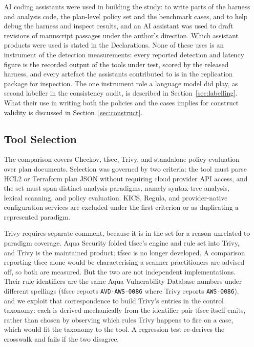 \documentclass[smallextended]{svjour3}
\begin{document}
AI coding assistants were used in building the study: to write parts of the
harness and analysis code, the plan-level policy set and the benchmark cases, and
to help debug the harness and inspect results, and an AI assistant was used to
draft revisions of manuscript passages under the author's direction. Which
assistant products were used is stated in the Declarations. None of these
uses is an instrument of the detection measurements: every reported detection and
latency figure is the recorded output of the tools under test, scored by the
released harness, and every artefact the assistants contributed to is in the
replication package for inspection. The one instrument role a language model did
play, as second labeller in the consistency audit, is described in
Section~\ref{sec:labelling}. What their use in writing both the
policies and the cases implies for construct validity is discussed in
Section~\ref{sec:construct}.

\subsection{Tool Selection}
\label{sec:toolsel}
The comparison covers Checkov, tfsec, Trivy, and standalone policy evaluation
over plan documents. Selection was governed by two criteria: the tool must parse
HCL2 or Terraform plan JSON without requiring cloud provider API access, and the
set must span distinct analysis paradigms, namely syntax-tree analysis, lexical
scanning, and policy evaluation. KICS, Regula, and provider-native configuration
services are excluded under the first criterion or as duplicating a represented
paradigm.

Trivy requires separate comment, because it is in the set for a reason unrelated
to paradigm coverage. Aqua Security folded tfsec's engine and rule set into
Trivy, and Trivy is the maintained product; tfsec is no longer developed. A
comparison reporting tfsec alone would be characterising a scanner practitioners
are advised off, so both are measured. But the two are not independent
implementations. Their rule identifiers are the same Aqua Vulnerability Database
numbers under different spellings (tfsec reports \texttt{AVD-AWS-0086} where
Trivy reports \texttt{AWS-0086}), and we exploit that correspondence to build
Trivy's entries in the control taxonomy: each is derived mechanically from the
identifier pair tfsec itself emits, rather than chosen by observing which rules
Trivy happens to fire on a case, which would fit the taxonomy to the tool. A
regression test re-derives the crosswalk and fails if the two disagree.
\end{document}
